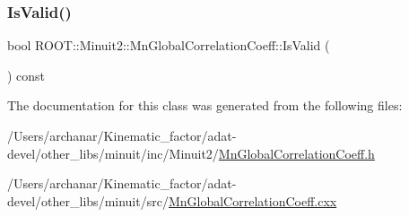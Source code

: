\subsubsection{\texorpdfstring{IsValid()}{IsValid()}\hspace{0.1cm}{\footnotesize\ttfamily [3/3]}}
{\footnotesize\ttfamily bool R\+O\+O\+T\+::\+Minuit2\+::\+Mn\+Global\+Correlation\+Coeff\+::\+Is\+Valid (\begin{DoxyParamCaption}{ }\end{DoxyParamCaption}) const\hspace{0.3cm}{\ttfamily [inline]}}



The documentation for this class was generated from the following files\+:\begin{DoxyCompactItemize}
\item 
/\+Users/archanar/\+Kinematic\+\_\+factor/adat-\/devel/other\+\_\+libs/minuit/inc/\+Minuit2/\mbox{\hyperlink{adat-devel_2other__libs_2minuit_2inc_2Minuit2_2MnGlobalCorrelationCoeff_8h}{Mn\+Global\+Correlation\+Coeff.\+h}}\item 
/\+Users/archanar/\+Kinematic\+\_\+factor/adat-\/devel/other\+\_\+libs/minuit/src/\mbox{\hyperlink{adat-devel_2other__libs_2minuit_2src_2MnGlobalCorrelationCoeff_8cxx}{Mn\+Global\+Correlation\+Coeff.\+cxx}}\end{DoxyCompactItemize}
